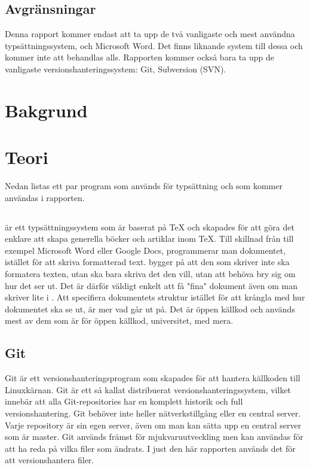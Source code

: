 \subsection{Avgränsningar}
Denna rapport kommer endast att ta upp de två vanligaste och mest användna typsättningssystem, \latex och Microsoft Word. Det finns liknande system till dessa och kommer inte att behandlas alls. Rapporten kommer också bara ta upp de vanligaste versionshanteringssystem: Git, Subversion (SVN).

\section{Bakgrund}
\label{sec:background-tuhkala}



\section{Teori}
\label{sec:theory-tuhkala}
Nedan listas ett par program som används för typsättning och som kommer användas i rapporten.
\subsection{\latex}
\latex är ett typsättningssystem som är baserat på TeX och skapades för att göra det enklare att skapa generella böcker och artiklar inom TeX. Till skillnad från till exempel Microsoft Word eller Google Docs, programmerar man dokumentet, istället för att skriva formatterad text. \latex bygger på att den som skriver inte ska formatera texten, utan ska bara skriva det den vill, utan att behöva bry sig om hur det ser ut.  Det är därför väldigt enkelt att få "fina" dokument även om man skriver lite i \latex. Att specifiera dokumentets struktur istället för att krångla med hur dokumentet ska se ut, är mer vad \latex går ut på. Det är öppen källkod och används mest av dem som är för öppen källkod, universitet, med mera.

\subsection{Git}
Git är ett versionshanteringsprogram som skapades för att hantera källkoden till Linuxkärnan. Git är ett så kallat distribuerat versionshanteringssystem, vilket innebär att alla Git-repositories har en komplett historik och full versionshantering. Git behöver inte heller nätverkstillgång eller en central server. Varje repository är sin egen server, även om man kan sätta upp en central server som är master. Git används främst för mjukvaruutveckling men kan användas för att ha reda på vilka filer som ändrats. I just den här rapporten används det för att versionshantera \latex filer.


